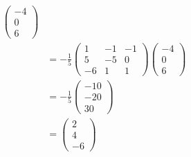 \documentclass{article}
\begin{document}
\begin{align*}
\begin{pmatrix}
                                                                 -4 \\
                                                                 0  \\
                                                                 6
                                                               \end{pmatrix} \\
                                & = -\frac{1}{5} \begin{pmatrix}
                                                   1  & -1 & -1 \\
                                                   5  & -5 & 0  \\
                                                   -6 & 1  & 1
                                                 \end{pmatrix} \begin{pmatrix}
                                                                 -4 \\
                                                                 0  \\
                                                                 6
                                                               \end{pmatrix} \\
                                & = -\frac{1}{5} \begin{pmatrix}
                                                   -10 \\
                                                   -20 \\
                                                   30
                                                 \end{pmatrix}               \\
                                & = \begin{pmatrix}
                                      2 \\
                                      4 \\
                                      -6
                                    \end{pmatrix}
\end{align*}

\setcounter{subsubsection}{54}
\subsubsection{}
\end{document}
